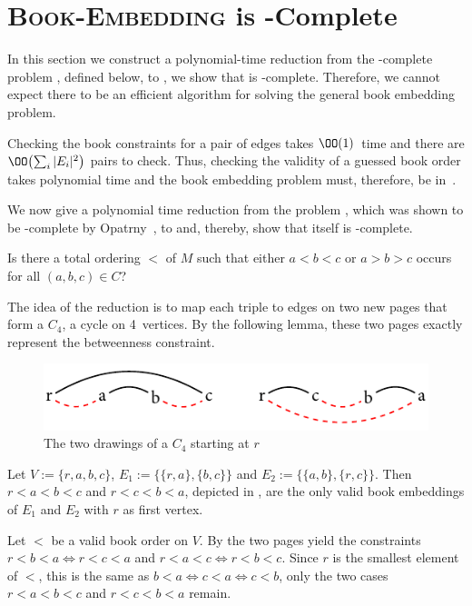 \section{\textsc{Book-Embedding} is \NP-Complete}
\label{section:np-complete}

In this section we
construct a polynomial-time reduction from the \NP-complete problem \probBetween, defined below,
to \probBook, \ie we show that \probBook is \NP-complete. Therefore,
we cannot expect there to be an efficient algorithm for solving the general
book embedding problem.

Checking the book constraints for a pair of edges takes $\OO(1)$~time
and there are $\OO\bigl(\sum_{i} |E_i|^2\bigr)$ pairs to check.
Thus, checking the validity of a guessed book order takes polynomial
time and the book embedding problem must, therefore, be in~\NP.

We now give a polynomial time reduction from the problem \probBetween, which was shown to be \NP-complete by Opatrny~\cite{opatrny:79}, to \probBook and, thereby, show that \probBook itself is \NP-complete.

{Is there a total ordering $<$ of $M$ such that either $a < b < c$ or $a > b > c$ occurs for all $(a, b, c) \in C$?}

The idea of the reduction is to map each triple to edges on two new pages that form a $C_4$, a cycle on 4~vertices. By
the following lemma, these two pages exactly represent the betweenness constraint.

\begin{figure}[\placement]\centering
    \includegraphics{figures/t_np_c4}
    \caption[Drawings of $C_4$]{The two drawings of a $C_4$ starting at $r$}
    \label{figure:np-c4}
\end{figure}

\begin{lemma}
\label{lemma:np-c4}
Let $V := \{r, a, b, c\}$, $E_1 := \bigl\{\{r, a\},\{b, c\}\bigr\}$ and $E_2 := \bigl\{\{a, b\}, \{r, c\}\bigr\}$. Then
$r < a < b < c$ and $r < c < b < a$, depicted in , are the only valid book embeddings of $E_1$ and $E_2$ with 
$r$ as first vertex.
\end{lemma}
\begin{myproof}
Let $<$ be a valid book order on $V$.
By  the two pages yield the constraints $r < b < a \Leftrightarrow r < c < a$
and $r < a < c \Leftrightarrow r < b < c$. Since $r$ is the smallest element of $<$, this
is the same as $b < a \Leftrightarrow c < a \Leftrightarrow c < b$, \ie only the two cases $r < a < b < c$ and
$r < c < b < a$ remain.
\end{myproof}

